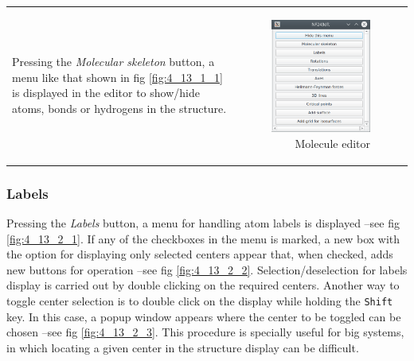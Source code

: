 \documentclass[10pt]{article}
\begin{document}
\begin{tabular}{lr}
\begin{minipage}{.5\linewidth}
Pressing the {\it Molecular skeleton} button, a menu like that shown in fig \ref{fig:4_13_1_1}
is displayed in the editor to show/hide atoms, bonds or hydrogens in the structure.
\end{minipage}
&
\begin{minipage}{.5\linewidth}
\begin{figure}[H]
    \begin{center}
        \includegraphics[width=0.7\linewidth]{damqt320_molecule_edit.png}
    \end{center}
    \caption{{Molecule editor}\label{fig:4_13_2}}
\end{figure}
\end{minipage}
\end{tabular}


\subsubsection{Labels \label{sec:4.13.2}}

Pressing the {\it Labels} button, a menu for handling atom labels is displayed --see fig 
\ref{fig:4_13_2_1}. If any of the checkboxes in the menu is marked, a new box with the option
for displaying only selected centers appear that, when checked, adds new buttons for operation
--see fig \ref{fig:4_13_2_2}. Selection/deselection for labels display is carried out by double clicking
on the required centers. Another way to toggle center selection is to double 
click on the display while holding the \texttt{Shift} key. In this case, a popup window appears where
the center to be toggled can be chosen --see fig \ref{fig:4_13_2_3}. This procedure is
specially useful for big systems, in which locating a given center in the structure display
can be difficult.
\end{document}
